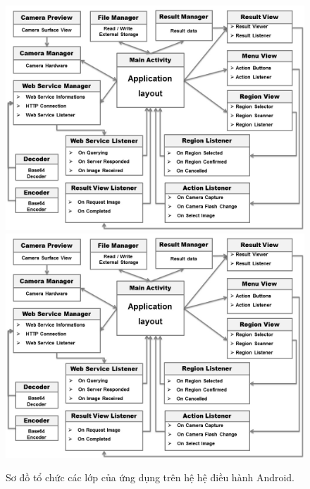 \begin{figure}[!htbp]
  \begin{center}
    \leavevmode
    \ifpdf
      \includegraphics[scale=0.4]{client_model}
    \else
      \includegraphics[scale=0.4]{client_model}
    \fi
    \caption[Sơ đồ tổ chức các lớp của ứng dụng trên hệ hệ điều hành Android.]{Sơ đồ tổ chức các lớp của ứng dụng trên hệ hệ điều hành Android.}
    \label{FigClientFramework}
  \end{center}
\end{figure}

